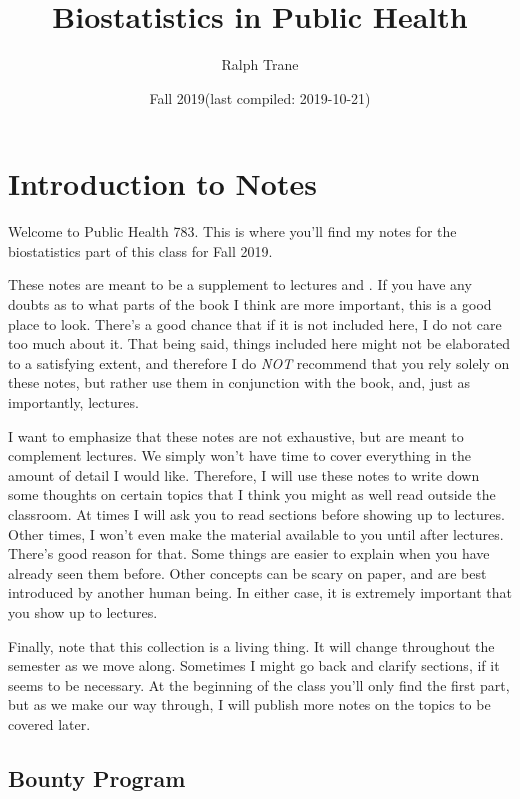 \documentclass[]{book}
\title{Biostatistics in Public Health}
\author{Ralph Trane}
\date{Fall 2019(last compiled: 2019-10-21)}
\theoremstyle{definition}
\theoremstyle{definition}
\theoremstyle{definition}
\theoremstyle{remark}
\begin{document}
\maketitle

{
\setcounter{tocdepth}{1}
\tableofcontents
}
\hypertarget{introduction-to-notes}{%
\chapter{Introduction to Notes}\label{introduction-to-notes}}

\newcommand{\Var}{\text{Var}}
\newcommand{\var}{\text{var}}
\newcommand{\SD}{\text{SD}}

Welcome to Public Health 783. This is where you'll find my notes for the biostatistics part of this class for Fall 2019.

These notes are meant to be a supplement to lectures and \citet{ls}. If you have any doubts as to what parts of the book I think are more important, this is a good place to look. There's a good chance that if it is not included here, I do not care too much about it. That being said, things included here might not be elaborated to a satisfying extent, and therefore I do \emph{NOT} recommend that you rely solely on these notes, but rather use them in conjunction with the book, and, just as importantly, lectures.

I want to emphasize that these notes are not exhaustive, but are meant to complement lectures. We simply won't have time to cover everything in the amount of detail I would like. Therefore, I will use these notes to write down some thoughts on certain topics that I think you might as well read outside the classroom. At times I will ask you to read sections before showing up to lectures. Other times, I won't even make the material available to you until after lectures. There's good reason for that. Some things are easier to explain when you have already seen them before. Other concepts can be scary on paper, and are best introduced by another human being. In either case, it is extremely important that you show up to lectures.

Finally, note that this collection is a living thing. It will change throughout the semester as we move along. Sometimes I might go back and clarify sections, if it seems to be necessary. At the beginning of the class you'll only find the first part, but as we make our way through, I will publish more notes on the topics to be covered later.

\hypertarget{bounty-program}{%
\section*{Bounty Program}\label{bounty-program}}
\end{document}
